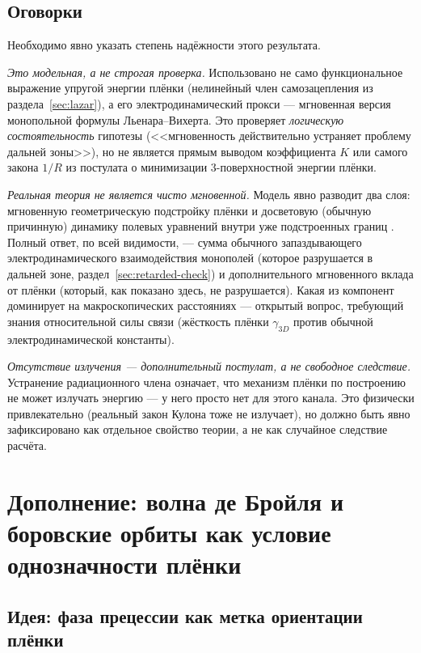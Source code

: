 \documentclass[12pt,a4paper]{article}
\begin{document}
\subsection{Оговорки}

Необходимо явно указать степень надёжности этого результата.

\emph{Это модельная, а не строгая проверка.} Использовано не само
функциональное выражение упругой энергии плёнки (нелинейный член
самозацепления из раздела~\ref{sec:lazar}), а его электродинамический
прокси --- мгновенная версия монопольной формулы Льенара--Вихерта. Это
проверяет \emph{логическую состоятельность} гипотезы (<<мгновенность
действительно устраняет проблему дальней зоны>>), но не является прямым
выводом коэффициента $K$ или самого закона $1/R$ из постулата о
минимизации 3-поверхностной энергии плёнки.

\emph{Реальная теория не является чисто мгновенной.} Модель явно
разводит два слоя: мгновенную геометрическую подстройку плёнки и
досветовую (обычную причинную) динамику полевых уравнений внутри уже
подстроенных границ \cite{coax}. Полный ответ, по всей видимости, ---
сумма обычного запаздывающего электродинамического взаимодействия
монополей (которое разрушается в дальней зоне, раздел~\ref{sec:retarded-check})
и дополнительного мгновенного вклада от плёнки (который, как показано
здесь, не разрушается). Какая из компонент доминирует на макроскопических
расстояниях --- открытый вопрос, требующий знания относительной силы
связи (жёсткость плёнки $\gamma_{3D}$ против обычной электродинамической
константы).

\emph{Отсутствие излучения --- дополнительный постулат, а не свободное
следствие.} Устранение радиационного члена означает, что механизм плёнки
по построению не может излучать энергию --- у него просто нет для этого
канала. Это физически привлекательно (реальный закон Кулона тоже не
излучает), но должно быть явно зафиксировано как отдельное свойство
теории, а не как случайное следствие расчёта.

\section{Дополнение: волна де Бройля и боровские орбиты как условие однозначности плёнки}
\label{sec:debroglie}

\subsection{Идея: фаза прецессии как метка ориентации плёнки}
\end{document}
